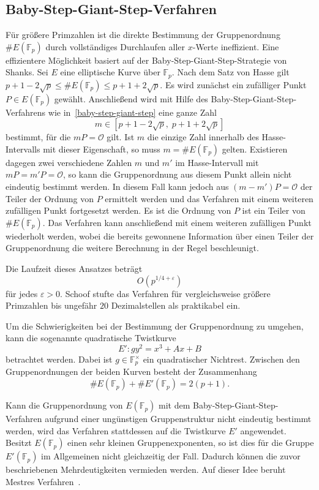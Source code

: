 \subsection{Baby-Step-Giant-Step-Verfahren}
Für größere Primzahlen ist die direkte Bestimmung der Gruppenordnung
$\#E(\mathbb F_p)$ durch vollständiges Durchlaufen aller $x$-Werte
ineffizient. Eine effizientere Möglichkeit basiert auf der
Baby-Step-Giant-Step-Strategie von Shanks. Sei $E$ eine elliptische Kurve über $\mathbb F_p$. Nach dem Satz von Hasse gilt \( p+1-2\sqrt p \leq\#E(\mathbb F_p)\leq p+1+2\sqrt p\). Es wird zunächst ein zufälliger Punkt $P\in E(\mathbb{F}_p)$ gewählt. Anschließend wird mit Hilfe des Baby-Step-Giant-Step-Verfahrens wie in~\ref{baby-step-giant-step} eine ganze Zahl
\[
    m\in
    [p+1-2\sqrt p,\;p+1+2\sqrt p]
\]
bestimmt, für die $mP=\mathcal{O}$ gilt. Ist $m$ die einzige Zahl innerhalb des Hasse-Intervalls mit dieser Eigenschaft, so muss $m=\#E(\mathbb{F}_p)$ gelten. Existieren dagegen zwei verschiedene Zahlen $m$ und $m'$ im Hasse-Intervall mit $mP=m'P=\mathcal{O}$, so kann die Gruppenordnung aus diesem Punkt allein nicht eindeutig bestimmt werden. In diesem Fall kann jedoch aus $(m-m')P=\mathcal{O}$ der Teiler der Ordnung von \(P\) ermittelt werden und das Verfahren mit einem weiteren zufälligen Punkt fortgesetzt werden. Es ist die Ordnung von $P$ ist ein Teiler von $\#E(\mathbb{F}_p)$. Das Verfahren kann anschließend mit einem weiteren zufälligen Punkt wiederholt werden, wobei die bereits gewonnene Information über einen Teiler der Gruppenordnung die weitere Berechnung in der Regel beschleunigt.

Die Laufzeit dieses Ansatzes beträgt
\[
    O\left(p^{1/4+\varepsilon}\right)
\]
für jedes $\varepsilon>0$. Schoof stufte das Verfahren für vergleichsweise größere Primzahlen bis ungefähr $20$ Dezimalstellen als praktikabel ein.
\begin{bemerkung}
    Um die Schwierigkeiten bei der Bestimmung der Gruppenordnung zu umgehen, kann die sogenannte quadratische Twistkurve
    \[
        E':gy^2=x^3+Ax+B
    \]
    betrachtet werden. Dabei ist $g\in\mathbb F_p^\times$ ein quadratischer Nichtrest.
    Zwischen den Gruppenordnungen der beiden Kurven besteht der Zusammenhang
    \[
        \#E(\mathbb F_p)+\#E'(\mathbb F_p)=2(p+1).
    \]

    Kann die Gruppenordnung von $E(\mathbb F_p)$ mit dem Baby-Step-Giant-Step-Verfahren aufgrund einer ungünstigen Gruppenstruktur nicht eindeutig bestimmt werden, wird das Verfahren stattdessen auf die Twistkurve $E'$ angewendet. Besitzt $E(\mathbb F_p)$ einen sehr kleinen Gruppenexponenten, so ist dies für die Gruppe $E'(\mathbb F_p)$ im Allgemeinen nicht gleichzeitig der Fall. Dadurch können die zuvor beschriebenen Mehrdeutigkeiten vermieden werden. Auf dieser Idee beruht Mestres Verfahren~\cite[S.~224--228]{schoof95}.
\end{bemerkung}

